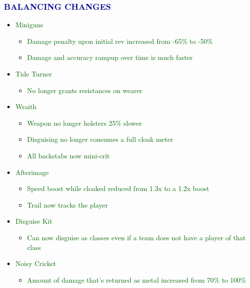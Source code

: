 \documentclass{article}
\begin{document}
\subsubsection*{\textcolor{darkblue}{BALANCING CHANGES}}

\begin{itemize}
    \item \textcolor{darkgreen}{Miniguns}
    \begin{itemize}
        \item \textcolor{darkgreen}{Damage penalty upon initial rev increased from -65\% to -50\%}
        \item \textcolor{darkgreen}{Damage and accuracy rampup over time is much faster}
    \end{itemize}
    \item \textcolor{darkgreen}{Tide Turner}
    \begin{itemize}
        \item \textcolor{darkgreen}{No longer grants resistances on wearer}
    \end{itemize}
    \item \textcolor{darkgreen}{Wraith}
    \begin{itemize}
        \item \textcolor{darkgreen}{Weapon no longer holsters 25\% slower}
        \item \textcolor{darkgreen}{Disguising no longer consumes a full cloak meter}
        \item \textcolor{darkgreen}{All backstabs now mini-crit}
    \end{itemize}
    \item \textcolor{darkgreen}{Afterimage}
    \begin{itemize}
        \item \textcolor{darkgreen}{Speed boost while cloaked reduced from 1.3x to a 1.2x boost}
        \item \textcolor{darkgreen}{Trail now tracks the player}
    \end{itemize}
    \item \textcolor{darkgreen}{Disguise Kit}
    \begin{itemize}
        \item \textcolor{darkgreen}{Can now disguise as classes even if a team does not have a player of that class}
    \end{itemize}
    \item \textcolor{darkgreen}{Noisy Cricket}
    \begin{itemize}
        \item \textcolor{darkgreen}{Amount of damage that's returned as metal increased from 70\% to 100\%}

\end{itemize}
\end{itemize}
\end{document}
